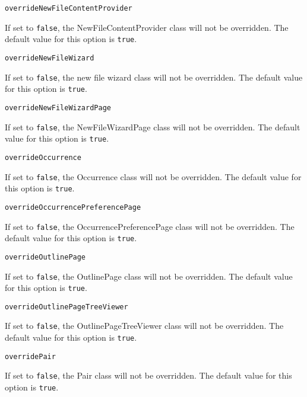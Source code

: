 \noindent\texttt{overrideNewFileContentProvider}
\begin{myindentpar}{1cm}
If set to \texttt{false}, the NewFileContentProvider class will not be overridden. The default value for this option is \texttt{true}.
\end{myindentpar}

\noindent\texttt{overrideNewFileWizard}
\begin{myindentpar}{1cm}
If set to \texttt{false}, the new file wizard class will not be overridden. The default value for this option is \texttt{true}.
\end{myindentpar}

\noindent\texttt{overrideNewFileWizardPage}
\begin{myindentpar}{1cm}
If set to \texttt{false}, the NewFileWizardPage class will not be overridden. The default value for this option is \texttt{true}.
\end{myindentpar}

\noindent\texttt{overrideOccurrence}
\begin{myindentpar}{1cm}
If set to \texttt{false}, the Occurrence class will not be overridden. The default value for this option is \texttt{true}.
\end{myindentpar}

\noindent\texttt{overrideOccurrencePreferencePage}
\begin{myindentpar}{1cm}
If set to \texttt{false}, the OccurrencePreferencePage class will not be overridden. The default value for this option is \texttt{true}.
\end{myindentpar}

\noindent\texttt{overrideOutlinePage}
\begin{myindentpar}{1cm}
If set to \texttt{false}, the OutlinePage class will not be overridden. The default value for this option is \texttt{true}.
\end{myindentpar}

\noindent\texttt{overrideOutlinePageTreeViewer}
\begin{myindentpar}{1cm}
If set to \texttt{false}, the OutlinePageTreeViewer class will not be overridden. The default value for this option is \texttt{true}.
\end{myindentpar}

\noindent\texttt{overridePair}
\begin{myindentpar}{1cm}
If set to \texttt{false}, the Pair class will not be overridden. The default value for this option is \texttt{true}.
\end{myindentpar}


